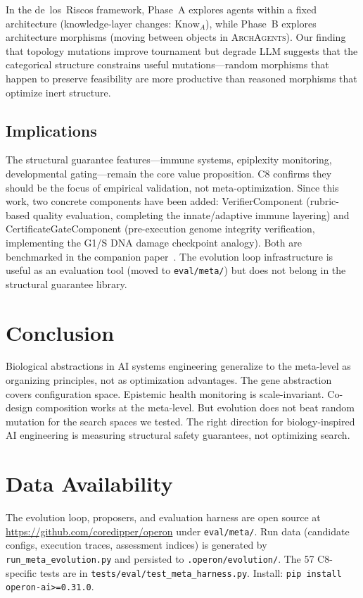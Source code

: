 \documentclass[11pt]{article}
\begin{document}
In the de~los~Riscos framework, Phase~A explores agents within a fixed
architecture (knowledge-layer changes: $\text{Know}_A$), while Phase~B
explores architecture morphisms (moving between objects in
\textsc{ArchAgents}). Our finding that topology mutations improve
tournament but degrade LLM suggests that the categorical structure
constrains useful mutations---random morphisms that happen to preserve
feasibility are more productive than reasoned morphisms that optimize
inert structure.

\subsection{Implications}

The structural guarantee features---immune systems, epiplexity monitoring,
developmental gating---remain the core value proposition. C8 confirms
they should be the focus of empirical validation, not meta-optimization.
Since this work, two concrete components have been added:
VerifierComponent (rubric-based quality evaluation, completing the
innate/adaptive immune layering) and CertificateGateComponent
(pre-execution genome integrity verification, implementing the G1/S
DNA damage checkpoint analogy).  Both are benchmarked in the companion
paper~\cite{banu2026benchmarks}.
The evolution loop infrastructure is useful as an evaluation tool (moved
to \texttt{eval/meta/}) but does not belong in the structural guarantee
library.

\section{Conclusion}

Biological abstractions in AI systems engineering generalize to the
meta-level as organizing principles, not as optimization advantages. The
gene abstraction covers configuration space. Epistemic health monitoring
is scale-invariant. Co-design composition works at the meta-level. But
evolution does not beat random mutation for the search spaces we tested.
The right direction for biology-inspired AI engineering is measuring
structural safety guarantees, not optimizing search.

\section*{Data Availability}

The evolution loop, proposers, and evaluation harness are open source at
\url{https://github.com/coredipper/operon} under \texttt{eval/meta/}.
Run data (candidate configs, execution traces, assessment indices) is
generated by \texttt{run\_meta\_evolution.py} and persisted to
\texttt{.operon/evolution/}. The 57 C8-specific tests are in
\texttt{tests/eval/test\_meta\_harness.py}. Install: \texttt{pip install
operon-ai>=0.31.0}.



\end{document}
